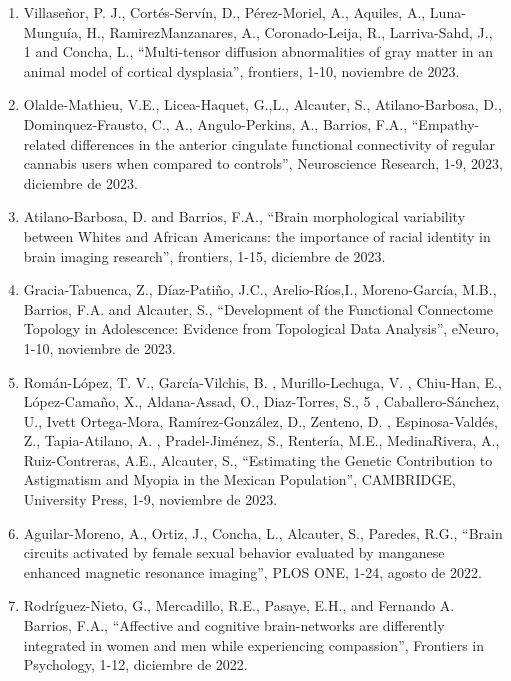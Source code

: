 \begin{enumerate}
\item Villaseñor, P. J., Cortés-Servín, D., Pérez-Moriel, A., Aquiles, A., Luna-Munguía, H., RamirezManzanares, A., Coronado-Leija, R., 
Larriva-Sahd, J., 1 and Concha, L., “Multi-tensor diffusion abnormalities of gray matter in an animal model of cortical dysplasia”, 
frontiers, 1-10, noviembre de 2023.

\item Olalde-Mathieu, V.E., Licea-Haquet, G.,L., Alcauter, S., Atilano-Barbosa, D., Dominquez-Frausto, C., A., Angulo-Perkins, A., Barrios, 
F.A., 
“Empathy-related differences in the anterior cingulate functional connectivity of regular cannabis users when compared to controls”, 
Neuroscience Research, 1-9, 2023, diciembre de 2023.

\item Atilano-Barbosa, D. and Barrios, F.A., “Brain morphological variability between Whites and African Americans: the importance of racial 
identity in brain imaging research”, frontiers, 1-15, diciembre de 2023.

\item Gracia-Tabuenca, Z., Díaz-Patiño, J.C., Arelio-Ríos,I., Moreno-García, M.B., Barrios, F.A. and Alcauter, S., “Development of the 
Functional 
Connectome Topology in Adolescence: Evidence from Topological Data Analysis”, eNeuro, 1-10, noviembre de 2023.

\item Román-López, T. V., García-Vilchis, B. , Murillo-Lechuga, V. , Chiu-Han, E., López-Camaño, X., Aldana-Assad, O., Diaz-Torres, S., 5 , 
Caballero-Sánchez, U., Ivett Ortega-Mora, Ramírez-González, D., Zenteno, D. , Espinosa-Valdés, Z., Tapia-Atilano, A. , Pradel-Jiménez, S., 
Rentería, M.E., MedinaRivera, A., Ruiz-Contreras, A.E., Alcauter, S., “Estimating the Genetic Contribution to Astigmatism and Myopia in the 
Mexican Population”, CAMBRIDGE, University Press, 1-9, noviembre de 2023.

\item Aguilar-Moreno, A., Ortiz, J., Concha, L., Alcauter, S., Paredes, R.G., “Brain circuits activated by female sexual behavior evaluated 
by 
manganese enhanced magnetic resonance imaging”, PLOS ONE, 1-24, agosto de 2022.

\item Rodríguez-Nieto, G., Mercadillo, R.E., Pasaye, E.H., and Fernando A. Barrios, F.A., “Affective and cognitive brain-networks are 
differently 
integrated in women and men while experiencing compassion”, Frontiers in Psychology, 1-12, diciembre de 2022.


\end{enumerate}
